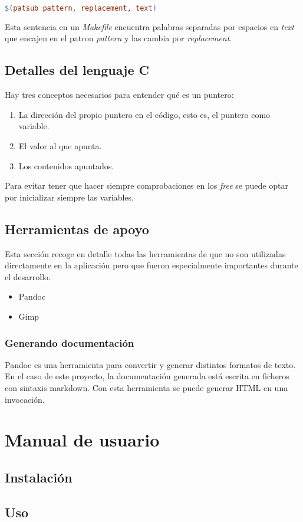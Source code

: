 \begin{lstlisting}[language=make,caption={Sustitución de pratrones},label=lst:sustitucion-pratrones]
$(patsub pattern, replacement, text)
\end{lstlisting}

Esta sentencia en un \emph{Makefile} encuentra palabras separadas por espacios en \emph{text} que encajen en el patron \emph{pattern} y las cambia por \emph{replacement}.

\section{Detalles del lenguaje C}

Hay tres conceptos necesarios para entender qué es un puntero:

\begin{enumerate}
    \item La dirección del propio puntero en el código, esto es, el puntero como variable.
    \item El valor al que apunta.
    \item Los contenidos apuntados.
\end{enumerate}

Para evitar tener que hacer siempre comprobaciones en los \emph{free} se puede optar por inicializar siempre las variables.

\section{Herramientas de apoyo}

Esta sección recoge en detalle todas las herramientas de que no son utilizadas directamente en la aplicación pero que fueron especialmente importantes durante el desarrollo.

\begin{itemize}
    \item Pandoc
    \item Gimp
\end{itemize}

\subsection{Generando documentación}
Pandoc es una herramienta para convertir y generar distintos formatos de texto. En el caso de este proyecto, la documentación generada está escrita en ficheros con sintaxis markdown. Con esta herramienta se puede generar HTML en una invocación.


\chapter{Manual de usuario}
\label{chap:manual-usuario}

\section{Instalación}

\section{Uso}
